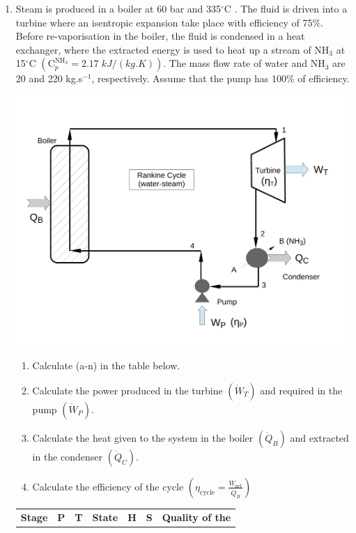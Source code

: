 \documentclass[12pts,a4paper,amsmath,amssymb,floatfix]{article}%
\newcommand{\frc}{\displaystyle\frac}
\begin{document}
\begin{enumerate}[label=\bfseries Problem \arabic*:]
\item\label{SolvedExample2} Steam is produced in a boiler at 60 bar and 335$^{\circ}$C . The fluid is driven into a turbine where an isentropic expansion take place with efficiency of 75$\%$. Before re-vaporisation in the boiler, the fluid is condensed in a heat exchanger, where the extracted energy is used to heat up a stream of NH$_{3}$ at 15$^{\circ}$C $\left(\text{C}_{p}^{\text{NH}_{3}}=2.17\; kJ/(kg.K)\right)$. The mass flow rate of water and NH$_{3}$ are 20 and 220 kg.s$^{-1}$, respectively. Assume that the pump has 100$\%$ of efficiency.
\begin{center}
\includegraphics[width=12.cm,height=8.cm,clip]{./Pics/RankineCycle2}
\label{exam_mod02_rankinecycle}
\end{center}
\begin{enumerate}
\item Calculate (a-n) in the table below.
\item Calculate the power produced in the turbine $\left(\dot{W}_{T}\right)$ and required in the pump $\left(\dot{W}_{P}\right)$.
\item Calculate the heat given to the system in the boiler $\left(\dot{Q}_{B}\right)$ and extracted in the condenser $\left(\dot{Q}_{C}\right)$.
\item Calculate the efficiency of the cycle $\left(\eta_{\text{cycle}}=\frc{\dot{W}_{\text{net}}}{\dot{Q}_{B}}\right)$
\end{enumerate}
\begin{center}
\begin{tabular} {||c | c c c c c c || }
\hline\hline
{\bf Stage} & {\bf P}    & {\bf T}        & {\bf State}    & {\bf H}             & {\bf S}                 &  {\bf Quality of the} \\

\end{tabular}
\end{center}
\end{enumerate}
\end{document}
